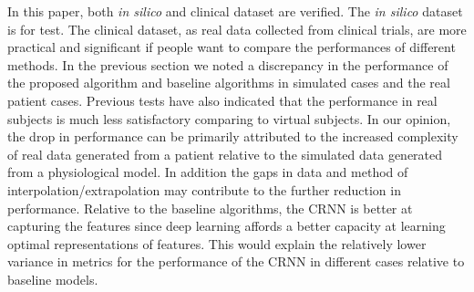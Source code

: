 \documentclass[a4paper, 10 pt, twocolumn]{IEEEtran}
\begin{document}
 In this paper, both \emph{in silico} and clinical dataset are verified. The \emph{in silico} dataset is for test. The clinical dataset, as real data collected from clinical trials, are more practical and significant if
 people want to compare the performances of different methods.
In the previous section we noted a discrepancy in the performance of the proposed algorithm and baseline algorithms in simulated cases and the real patient cases. Previous tests have also indicated that the performance in
real subjects is much less satisfactory comparing to virtual subjects. In our opinion, the drop in performance can be primarily attributed to the increased complexity of real data generated from a patient relative to the
simulated data generated from a physiological model. In addition the gaps in data and method of interpolation/extrapolation may contribute to the further reduction in performance. Relative to the baseline algorithms, the
CRNN is better at capturing the features since deep learning affords a better capacity at learning optimal representations of features. This would explain the relatively lower variance in metrics for the performance of
the CRNN in different cases relative to baseline models.
\end{document}
